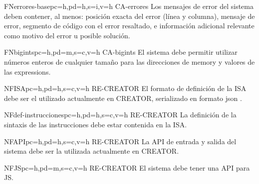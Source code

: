 \begin{softwareReq}{FN}{errores-base}{pc=h,pd=h,s=i,v=h}
    {CA-errores}
    Los mensajes de error del sistema deben contener, al menos: posición exacta
    del error (línea y columna), mensaje de error, segmento de código con el
    error resaltado, e información adicional relevante como motivo del error u
    posible solución.
\end{softwareReq}


\begin{softwareReq}{FN}{bigints}{pc=h,pd=m,s=c,v=h}
    {CA-bigints}
    El sistema debe permitir utilizar números enteros de cualquier tamaño para
    las direcciones de \gls{memory} y valores de las \glspl{expression}.
\end{softwareReq}


\begin{softwareReq}{NF}{ISA}{pc=h,pd=h,s=c,v=h}
    {RE-CREATOR}
    El formato de definición de la \gls{ISA} debe ser el utilizado
    actualmente en CREATOR, serializado en formato \gls{json}
    \parencite{JSONStandard}. %
\end{softwareReq}

\begin{softwareReq}{NF}{def-instrucciones}{pc=h,pd=h,s=c,v=h}
    {RE-CREATOR}
    La definición de la sintaxis de las instrucciones debe estar contenida en la
    \gls{ISA}.
\end{softwareReq}

\begin{softwareReq}{NF}{API}{pc=h,pd=h,s=c,v=h}
    {RE-CREATOR}
    La \gls{API} de entrada y salida del sistema debe ser la utilizada
    actualmente en CREATOR.
\end{softwareReq}

\begin{softwareReq}{NF}{JS}{pc=h,pd=m,s=c,v=h}
    {RE-CREATOR}
    El sistema debe tener una \gls{API} para \gls{JS}.
\end{softwareReq}

